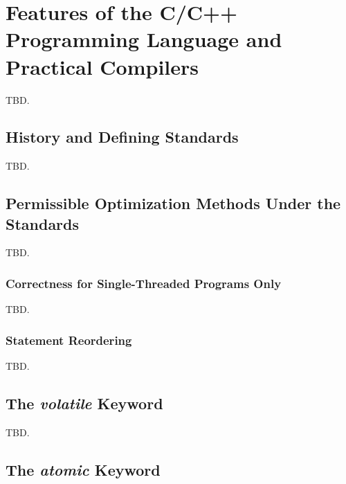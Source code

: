 \section{Features of the C/C++ Programming Language and Practical Compilers}
\label{scco0}

TBD.


\subsection{History and Defining Standards}
\label{scco0:shds0}

TBD.


\subsection{Permissible Optimization Methods Under the Standards}
\label{scco0:spom0}

TBD.


\subsubsection{Correctness for Single-Threaded Programs Only}
\label{scco0:spom0:scst0}

TBD.


\subsubsection{Statement Reordering}
\label{scco0:spom0:ssro0}

TBD.


\subsection{The \emph{volatile} Keyword}
\label{scco0:skwv0}

TBD.


\subsection{The \emph{atomic} Keyword}
\label{scco0:skwa0}

